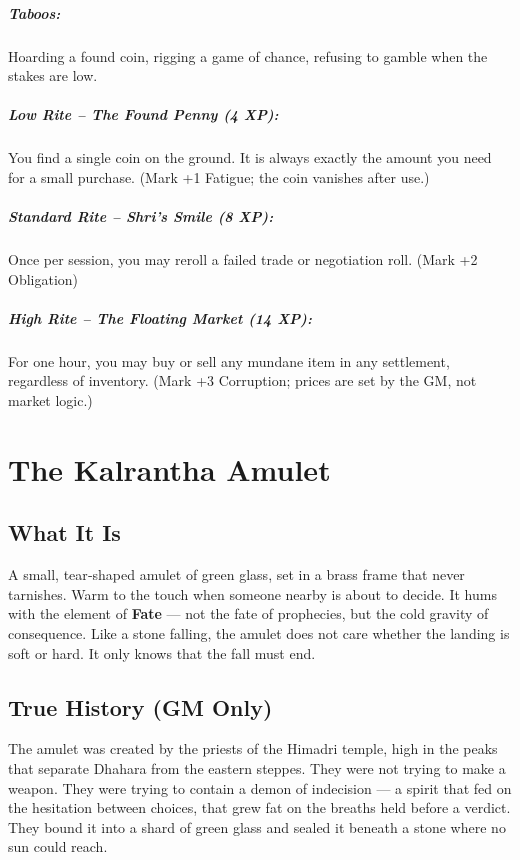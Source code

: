 \documentclass[11pt]{book}
\begin{document}
\paragraph{Taboos:} Hoarding a found coin, rigging a game of chance, refusing to gamble when the stakes are low.
\paragraph{Low Rite -- The Found Penny (4 XP):} You find a single coin on the ground. It is always exactly the amount you need for a small purchase. (Mark +1 Fatigue; the coin vanishes after use.)
\paragraph{Standard Rite -- Shri's Smile (8 XP):} Once per session, you may reroll a failed trade or negotiation roll. (Mark +2 Obligation)
\paragraph{High Rite -- The Floating Market (14 XP):} For one hour, you may buy or sell any mundane item in any settlement, regardless of inventory. (Mark +3 Corruption; prices are set by the GM, not market logic.)

\clearpage
\chapter{The Kalrantha Amulet}
\label{chap:kalrantha-adventure}

\section{What It Is}
A small, tear‑shaped amulet of green glass, set in a brass frame that never tarnishes. Warm to the touch when someone nearby is about to decide. It hums with the element of \textbf{Fate} — not the fate of prophecies, but the cold gravity of consequence. Like a stone falling, the amulet does not care whether the landing is soft or hard. It only knows that the fall must end.

\section{True History (GM Only)}

The amulet was created by the priests of the Himadri temple, high in the peaks that separate Dhahara from the eastern steppes. They were not trying to make a weapon. They were trying to contain a demon of indecision — a spirit that fed on the hesitation between choices, that grew fat on the breaths held before a verdict. They bound it into a shard of green glass and sealed it beneath a stone where no sun could reach.
\end{document}
